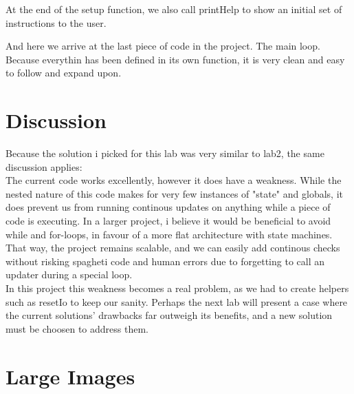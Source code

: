 \documentclass[journal]{IEEEtran}
\begin{document}
At the end of the setup function, we also call printHelp\(\) to show an initial
set of instructions to the user.


And here we arrive at the last piece of code in the project. The main loop.
Because everythin has been defined in its own function, it is very clean and
easy to follow and expand upon.

\section{Discussion}
Because the solution i picked for this lab was very similar to lab2,
the same discussion applies:\\

The current code works excellently, however it does have a weakness.
While the nested nature of this code makes for very few instances of "state" and
globals, it does prevent us from running continous updates on anything while
a piece of code is executing. In a larger project, i believe it would be
beneficial to avoid while and for-loops, in favour of a more flat architecture with
state machines. That way, the project remains scalable, and we can easily add
continous checks without risking spagheti code and human errors due to forgetting
to call an updater during a special loop.\\

In this project this weakness becomes a real problem, as we had to create helpers
such as resetIo\(\) to keep our sanity. Perhaps the next lab will present a case
where the current solutions' drawbacks far outweigh its benefits, and a new
solution must be choosen to address them.

\vfill\null
\pagebreak

\section{Large Images}
\end{document}
